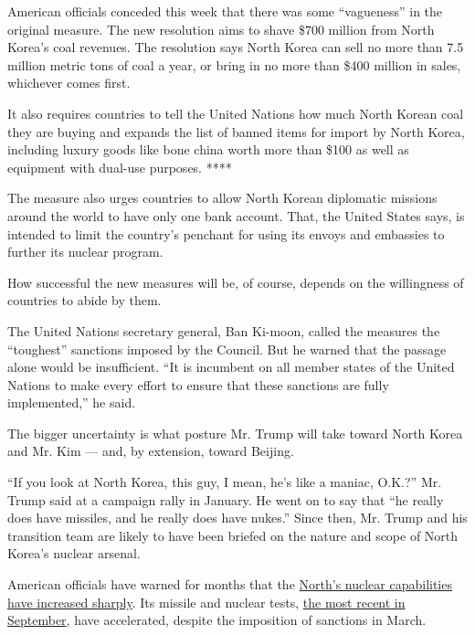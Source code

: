 American officials conceded this week that there was some ``vagueness''
in the original measure. The new resolution aims to shave \$700 million
from North Korea's coal revenues. The resolution says North Korea can
sell no more than 7.5 million metric tons of coal a year, or bring in no
more than \$400 million in sales, whichever comes first.

It also requires countries to tell the United Nations how much North
Korean coal they are buying and expands the list of banned items for
import by North Korea, including luxury goods like bone china worth more
than \$100 as well as equipment with dual-use purposes. ****

The measure also urges countries to allow North Korean diplomatic
missions around the world to have only one bank account. That, the
United States says, is intended to limit the country's penchant for
using its envoys and embassies to further its nuclear program.

How successful the new measures will be, of course, depends on the
willingness of countries to abide by them.

The United Nations secretary general, Ban Ki-moon, called the measures
the ``toughest'' sanctions imposed by the Council. But he warned that
the passage alone would be insufficient. ``It is incumbent on all member
states of the United Nations to make every effort to ensure that these
sanctions are fully implemented,'' he said.

The bigger uncertainty is what posture Mr. Trump will take toward North
Korea and Mr. Kim --- and, by extension, toward Beijing.

``If you look at North Korea, this guy, I mean, he's like a maniac,
O.K.?'' Mr. Trump said at a campaign rally in January. He went on to say
that ``he really does have missiles, and he really does have nukes.''
Since then, Mr. Trump and his transition team are likely to have been
briefed on the nature and scope of North Korea's nuclear arsenal.

American officials have warned for months that the
\href{http://www.nytimes.com/2016/05/07/world/asia/north-korea-nuclear-us-strategy.html}{North's
nuclear capabilities have increased sharply}. Its missile and nuclear
tests,
\href{http://www.nytimes.com/2016/09/09/world/asia/north-korea-nuclear-test.html?action=click\&contentCollection=Asia\%20Pacific\&module=RelatedCoverage\&region=Marginalia\&pgtype=article}{the
most recent in September}, have accelerated, despite the imposition of
sanctions in March.


